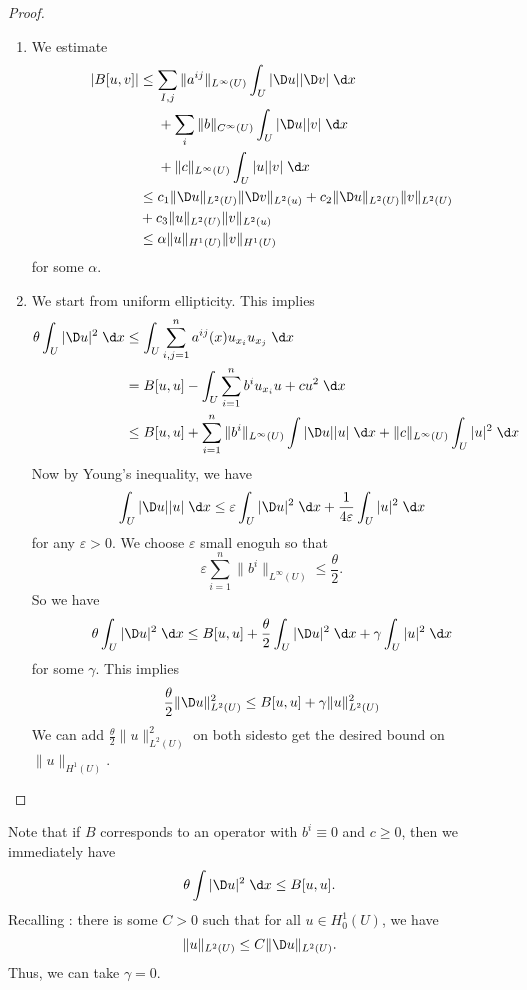 \documentclass[a4paper]{article}
\begin{document}
\begin{proof}\leavevmode
  \begin{enumerate}
    \item We estimate
      \begin{align*}
        |B[u, v]| &\leq \sum_{I, j} \|a^{ij}\|_{L^\infty(U)} \int_U |\D u| |\D v|\;\d x\\
        &\hphantom{{ {}={}}}+ \sum_i \|b\|_{C^\infty(U)} \int_U |\D u| |v| \;\d x\\
        &\hphantom{{ {}={}}}+ \|c\|_{L^\infty(U)} \int_U |u| |v| \;\d x\\
        &\leq c_1 \|\D u\|_{L^2(U)} \|\D v\|_{L^2(u)} + c_2 \| \D u\|_{L^2(U)} \|v\|_{L^2(U)} \\
        &+ c_3 \|u\|_{L^2(U)} \|v\|_{L^2(u)}\\
        &\leq \alpha \|u\|_{H^1(U)} \|v\|_{H^1(U)}
      \end{align*}
      for some $\alpha$.
    \item We start from uniform ellipticity. This implies
      \begin{align*}
        \theta \int_U |\D u|^2 \;\d x &\leq \int_U \sum_{i, j = 1}^n a^{ij}(x) u_{x_i} u_{x_j} \;\d x\\
        &= B[u ,u] - \int_U \sum_{i = 1}^n b^i u_{x_i} u + cu^2\;\d x\\
        &\leq B[u, u] + \sum_{i = 1}^n \|b^i\|_{L^\infty(U)} \int |\D u| |u| \;\d x + \|c\|_{L^\infty(U)} \int_U |u|^2\;\d x
      \end{align*}
      Now by Young's inequality, we have
      \[
        \int_U |\D u| |u| \;\d x \leq \varepsilon \int_U |\D u|^2 \;\d x + \frac{1}{4\varepsilon}\int_U |u|^2 \;\d x
      \]
      for any $\varepsilon > 0$. We choose $\varepsilon$ small enoguh so that
      \[
        \varepsilon\sum_{i = 1}^n \|b^i\|_{L^\infty(U)} \leq \frac{\theta}{2}.
      \]
      So we have
      \[
        \theta \int_U |\D u|^2 \;\d x \leq B[u, u] + \frac{\theta}{2} \int_U |\D u|^2 \;\d x + \gamma \int_U |u|^2\;\d x
      \]
      for some $\gamma$. This implies
      \[
        \frac{\theta}{2} \| \D u\|_{L^2(U)}^2 \leq B[u, u] + \gamma \|u\|_{L^2(U)}^2
      \]
      We can add $\frac{\theta}{2}\|u\|_{L^2(U)}^2$ on both sidesto get the desired bound on $\|u\|_{H^1(U)}$.
  \end{enumerate}
\end{proof}
Note that if $B$ corresponds to an operator with $b^i \equiv 0$ and $c \geq 0$, then we immediately have
\[
  \theta \int |\D u|^2 \;\d x \leq B[u, u].
\]
Recalling : there is some $C > 0$ such that for all $u \in H_0^1 (U)$, we have
\[
  \|u\|_{L^2(U)} \leq C \|\D u\|_{L^2(U)}.
\]
Thus, we can take $\gamma = 0$.
\end{document}
